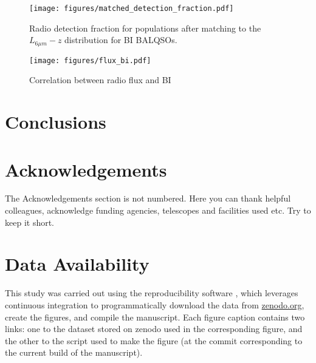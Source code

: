 \documentclass[fleqn,usenatbib]{mnras}
\begin{document}
\begin{figure}
    \centering
    \texttt{[image: figures/matched\_detection\_fraction.pdf]}
    \caption{Radio detection fraction for populations after matching to the$L_{6\mu m} - z $ distribution for BI BALQSOs. }
    \label{fig:matched_detection}
\end{figure}


\begin{figure}
    \centering
    \texttt{[image: figures/flux\_bi.pdf]}
    \caption{Correlation between radio flux and BI }
    \label{fig:flux_bi}
\end{figure}


\section{Conclusions}



\section*{Acknowledgements}

The Acknowledgements section is not numbered. Here you can thank helpful
colleagues, acknowledge funding agencies, telescopes and facilities used etc.
Try to keep it short.

\section*{Data Availability}

 
This study was carried out using the reproducibility software
\href{https://github.com/showyourwork/showyourwork}{\showyourwork}
\citep{Luger2021MappingModel}, which leverages continuous integration to
programmatically download the data from
\href{https://zenodo.org/}{zenodo.org}, create the figures, and
compile the manuscript. Each figure caption contains two links: one
to the dataset stored on zenodo used in the corresponding figure,
and the other to the script used to make the figure (at the commit
corresponding to the current build of the manuscript).







\end{document}
